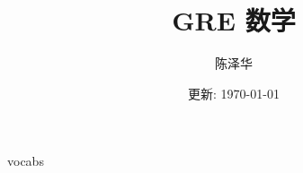 \documentclass{report}
\title{GRE 数学}
\author{陈泽华}
\date{更新: \today}
\begin{document}
  \maketitle
  \tableofcontents

  {vocabs}
\end{document}
